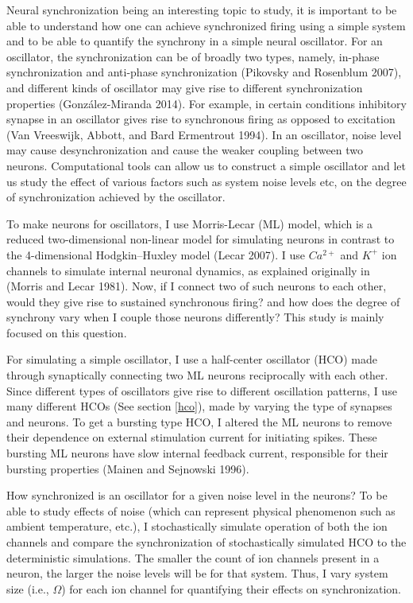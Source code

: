 \documentclass[
]{article}
\begin{document}
Neural synchronization being an interesting topic to study, it is important to be able to understand how one can achieve synchronized firing using a simple system and to be able to quantify the synchrony in a simple neural oscillator. For an oscillator, the synchronization can be of broadly two types, namely, in-phase synchronization and anti-phase synchronization (Pikovsky and Rosenblum 2007), and different kinds of oscillator may give rise to different synchronization properties (González-Miranda 2014). For example, in certain conditions inhibitory synapse in an oscillator gives rise to synchronous firing as opposed to excitation (Van Vreeswijk, Abbott, and Bard Ermentrout 1994). In an oscillator, noise level may cause desynchronization and cause the weaker coupling between two neurons. Computational tools can allow us to construct a simple oscillator and let us study the effect of various factors such as system noise levels etc, on the degree of synchronization achieved by the oscillator.

To make neurons for oscillators, I use Morris-Lecar (ML) model, which is a reduced two-dimensional non-linear model for simulating neurons in contrast to the 4-dimensional Hodgkin--Huxley model (Lecar 2007). I use \(Ca^{2+}\) and \(K^+\) ion channels to simulate internal neuronal dynamics, as explained originally in (Morris and Lecar 1981). Now, if I connect two of such neurons to each other, would they give rise to sustained synchronous firing? and how does the degree of synchrony vary when I couple those neurons differently? This study is mainly focused on this question.

For simulating a simple oscillator, I use a half-center oscillator (HCO) made through synaptically connecting two ML neurons reciprocally with each other. Since different types of oscillators give rise to different oscillation patterns, I use many different HCOs (See section \ref{hco}), made by varying the type of synapses and neurons. To get a bursting type HCO, I altered the ML neurons to remove their dependence on external stimulation current for initiating spikes. These bursting ML neurons have slow internal feedback current, responsible for their bursting properties (Mainen and Sejnowski 1996).

How synchronized is an oscillator for a given noise level in the neurons? To be able to study effects of noise (which can represent physical phenomenon such as ambient temperature, etc.), I stochastically simulate operation of both the ion channels and compare the synchronization of stochastically simulated HCO to the deterministic simulations. The smaller the count of ion channels present in a neuron, the larger the noise levels will be for that system. Thus, I vary system size (i.e., \(\Omega\)) for each ion channel for quantifying their effects on synchronization.
\end{document}
